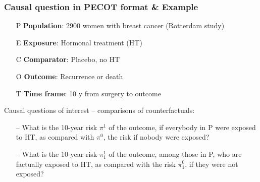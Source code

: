 \documentclass[12pt,dvipsnames,t,aspectratio=169, handout%
]{beamer}
\begin{document}
\begin{frame}
\frametitle{Causal question in PECOT format \& Example}

\begin{itemize}
\item[P] \textbf{Population}: 2900 women with breast cancer (Rotterdam study) 
\medskip
\item[E] \textbf{Exposure}: Hormonal treatment (HT)
\medskip
\item[C] \textbf{Comparator}: Placebo, no HT
\medskip
\item[O] \textbf{Outcome}: Recurrence or death
\medskip
\item[T] \textbf{Time frame}: 10 y from surgery to outcome
\end{itemize}

Causal questions of interest -- comparisons of counterfactuals:

\begin{itemize}
\item[--] What is the 10-year risk $\pi^1$ of the outcome,
if everybody in P were exposed to HT, as compared with $\pi^0$, the risk
if nobody were exposed?
\medskip
\item[--] What is the 10-year risk $\pi^1_1$ of the outcome,
among those in P, who are factually exposed to HT, as compared with the risk $\pi^0_1$, 
if they were not exposed?
\end{itemize}


\end{frame}
\end{document}
